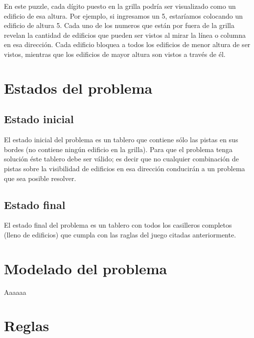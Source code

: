 \documentclass[%
	final,
	reprint,
	notitlepage,
	narroweqnarray,
	inline,
	twoside,
	invited
	]{ieee}
\begin{document}
\par En este puzzle, cada dígito puesto en la grilla podría ser visualizado como un edificio de esa altura. Por ejemplo, si ingresamos un 5, estaríamos colocando un edificio de altura 5. Cada uno de los numeros que están por fuera de la grilla revelan la cantidad de edificios que pueden ser vistos al mirar la línea o columna en esa dirección. Cada edificio bloquea a todos los edificios de menor altura de ser vistos, mientras que los edificios de mayor altura son vistos a través de él.


\section{Estados del problema}

\subsection{Estado inicial}

\par El estado inicial del problema es un tablero que contiene sólo las pistas en sus bordes (no contiene ningún edificio en la grilla). Para que el problema tenga solución éste tablero debe ser válido; es decir que no cualquier combinación de pistas sobre la visibilidad de edificios en esa dirección conducirán a un problema que sea posible resolver.

\subsection{Estado final}

\par El estado final del problema es un tablero con todos los casilleros completos (lleno de edificios) que cumpla con las raglas del juego citadas anteriormente.

\section{Modelado del problema}

\par Aaaaaa

\section{Reglas}
\end{document}
